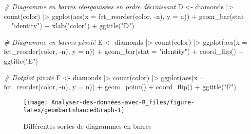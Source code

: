 \documentclass[
]{book}
\newenvironment{Shaded}{\begin{snugshade}}{\end{snugshade}}
\newcommand{\AttributeTok}[1]{\textcolor[rgb]{0.77,0.63,0.00}{#1}}
\newcommand{\CommentTok}[1]{\textcolor[rgb]{0.56,0.35,0.01}{\textit{#1}}}
\newcommand{\FunctionTok}[1]{\textcolor[rgb]{0.00,0.00,0.00}{#1}}
\newcommand{\NormalTok}[1]{#1}
\newcommand{\OtherTok}[1]{\textcolor[rgb]{0.56,0.35,0.01}{#1}}
\newcommand{\SpecialCharTok}[1]{\textcolor[rgb]{0.00,0.00,0.00}{#1}}
\newcommand{\StringTok}[1]{\textcolor[rgb]{0.31,0.60,0.02}{#1}}
\begin{document}
\begin{Shaded}
\begin{Highlighting}[]
\CommentTok{\# Diagramme en barres réorganisées en ordre décroissant}
\NormalTok{D }\OtherTok{\textless{}{-}} 
\NormalTok{  diamonds }\SpecialCharTok{|\textgreater{}}
  \FunctionTok{count}\NormalTok{(color) }\SpecialCharTok{|\textgreater{}}
  \FunctionTok{ggplot}\NormalTok{(}\FunctionTok{aes}\NormalTok{(}\AttributeTok{x =} \FunctionTok{fct\_reorder}\NormalTok{(color, }\SpecialCharTok{{-}}\NormalTok{n), }\AttributeTok{y =}\NormalTok{ n)) }\SpecialCharTok{+}
     \FunctionTok{geom\_bar}\NormalTok{(}\AttributeTok{stat =} \StringTok{"identity"}\NormalTok{) }\SpecialCharTok{+}
     \FunctionTok{xlab}\NormalTok{(}\StringTok{"color"}\NormalTok{) }\SpecialCharTok{+}
     \FunctionTok{ggtitle}\NormalTok{(}\StringTok{"D"}\NormalTok{) }

\CommentTok{\# Diagramme en barres pivoté}
\NormalTok{E }\OtherTok{\textless{}{-}} 
\NormalTok{  diamonds }\SpecialCharTok{|\textgreater{}}
  \FunctionTok{count}\NormalTok{(color) }\SpecialCharTok{|\textgreater{}}
  \FunctionTok{ggplot}\NormalTok{(}\FunctionTok{aes}\NormalTok{(}\AttributeTok{x =} \FunctionTok{fct\_reorder}\NormalTok{(color, }\SpecialCharTok{{-}}\NormalTok{n), }\AttributeTok{y =}\NormalTok{ n)) }\SpecialCharTok{+}
  \FunctionTok{geom\_bar}\NormalTok{(}\AttributeTok{stat =} \StringTok{"identity"}\NormalTok{) }\SpecialCharTok{+}
     \FunctionTok{coord\_flip}\NormalTok{() }\SpecialCharTok{+}
     \FunctionTok{ggtitle}\NormalTok{(}\StringTok{"E"}\NormalTok{)}

\CommentTok{\# Dotplot pivoté}
\NormalTok{F }\OtherTok{\textless{}{-}} 
\NormalTok{  diamonds }\SpecialCharTok{|\textgreater{}}
  \FunctionTok{count}\NormalTok{(color) }\SpecialCharTok{|\textgreater{}}
  \FunctionTok{ggplot}\NormalTok{(}\FunctionTok{aes}\NormalTok{(}\AttributeTok{x =} \FunctionTok{fct\_reorder}\NormalTok{(color, }\SpecialCharTok{{-}}\NormalTok{n), }\AttributeTok{y =}\NormalTok{ n)) }\SpecialCharTok{+}
     \FunctionTok{geom\_point}\NormalTok{() }\SpecialCharTok{+}
     \FunctionTok{coord\_flip}\NormalTok{() }\SpecialCharTok{+}
     \FunctionTok{ggtitle}\NormalTok{(}\StringTok{"F"}\NormalTok{)}
\end{Highlighting}
\end{Shaded}

\begin{figure}

{\centering \texttt{[image: Analyser-des-données-avec-R\_files/figure-latex/geombarEnhancedGraph-1]} 

}

\caption{Différentes sortes de diagrammes en barres}\label{fig:geombarEnhancedGraph}
\end{figure}
\end{document}
